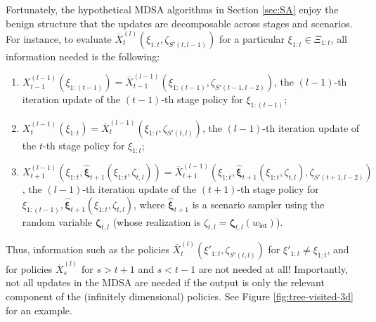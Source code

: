 \documentclass[11pt,fullpage,letterpaper]{article}
\newcommand{\bx}{\boldsymbol{\xi}}
\newcommand{\bz}{\boldsymbol{\zeta}}
\newcommand{\internal}{\mathsf{int}}
\begin{document}
Fortunately, the hypothetical MDSA algorithms in Section \ref{sec:SA} enjoy the benign structure that the updates are decomposable across stages and scenarios. For instance, to evaluate $\overline{X}_t^{(l)}(\xi_{1:t},\zeta_{S'(t,l-1)})$ for a particular $\xi_{1:t}\in \Xi_{1:t}$, all information needed is the following:
\begin{enumerate}
    \item $X_{t-1}^{(l-1)}(\xi_{1:(t-1)}) = \overline{X}_{t-1}^{(l-1)}(\xi_{1:(t-1)},\zeta_{S'(t-1,l-2)})$, the $(l-1)$-th iteration update of the $(t-1)$-th stage policy for $\xi_{1:(t-1)}$; 
    \item $X_{t}^{(l-1)}(\xi_{1:t}) =\overline{X}_t^{(l-1)}(\xi_{1:t},\zeta_{S'(t,l)})$, the $(l-1)$-th iteration update of the $t$-th stage policy for $\xi_{1:t}$; 
    \item $X_{t+1}^{(l-1)}(\xi_{1:t},\widehat{\bx}_{t+1}(\xi_{1:t},\zeta_{t,l})) =\overline{X}_{t+1}^{(l-1)}(\xi_{1:t},\widehat{\bx}_{t+1}(\xi_{1:t},\zeta_{t,l}),\zeta_{S'(t+1,l-2)})$, the $(l-1)$-th iteration update of the $(t+1)$-th stage policy for $\xi_{1:(t-1)},\widehat{\bx}_{t+1}(\xi_{1:t},\zeta_{t,l})$, where $\widehat{\bx}_{t+1}$ is a scenario sampler using the random variable $\bz_{t,l}$ (whose realization is $\zeta_{t,l} = \bz_{t,l}(w_{\internal})$). 
\end{enumerate}

Thus, information such as the policies $\overline{X}_t^{(l)}(\xi'_{1:t},\zeta_{S'(t,l)})$ for $\xi'_{1:t}\neq \xi_{1:t}$, and for policies $\overline{X}^{(l)}_s$ for $s> t+1$ and $s<t-1$ are not needed at all! Importantly, not all updates in the MDSA are needed if the output is only the relevant component of the (infinitely dimensional) policies. See Figure \ref{fig:tree-visited-3d} for an example.
\end{document}
